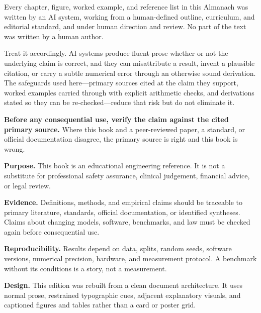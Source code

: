 \clearpage
\thispagestyle{empty}
\vspace*{\fill}
\small
\begin{tcolorbox}[
  enhanced,
  colback=AlmanachOchre!10,
  colframe=AlmanachOchre,
  boxrule=0pt,
  borderline west={1.4pt}{0pt}{AlmanachOchre},
  arc=1mm,
  left=3mm, right=3mm, top=2.4mm, bottom=2.4mm,
  fonttitle=\small\sffamily\bfseries,
  coltitle=AlmanachOchre!70!black,
  colbacktitle=AlmanachOchre!10,
  titlerule=0pt,
  title={This book was generated by artificial intelligence}]
Every chapter, figure, worked example, and reference list in this Almanach was
written by an AI system, working from a human-defined outline, curriculum, and
editorial standard, and under human direction and review. No part of the text
was written by a human author.

\smallskip
Treat it accordingly. AI systems produce fluent prose whether or not the
underlying claim is correct, and they can misattribute a result, invent a
plausible citation, or carry a subtle numerical error through an otherwise
sound derivation. The safeguards used here---primary sources cited at the
claim they support, worked examples carried through with explicit arithmetic
checks, and derivations stated so they can be re-checked---reduce that risk but
do not eliminate it.

\smallskip
\textbf{Before any consequential use, verify the claim against the cited
primary source.} Where this book and a peer-reviewed paper, a standard, or
official documentation disagree, the primary source is right and this book is
wrong.
\end{tcolorbox}

\vspace{2mm}

\textbf{Purpose.}
This book is an educational engineering reference. It is not a substitute
for professional safety assurance, clinical judgement, financial advice, or
legal review.

\textbf{Evidence.}
Definitions, methods, and empirical claims should be traceable to primary
literature, standards, official documentation, or identified syntheses.
Claims about changing models, software, benchmarks, and law must be checked
again before consequential use.

\textbf{Reproducibility.}
Results depend on data, splits, random seeds, software versions, numerical
precision, hardware, and measurement protocol. A benchmark without its
conditions is a story, not a measurement.

\textbf{Design.}
This edition was rebuilt from a clean document architecture. It uses normal
prose, restrained typographic cues, adjacent explanatory visuals, and
captioned figures and tables rather than a card or poster grid.
\vspace*{\fill}
\clearpage

